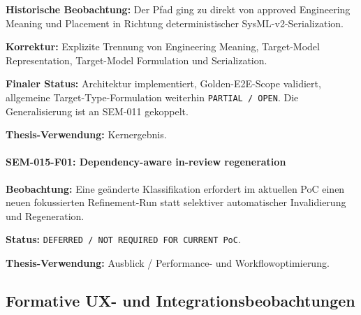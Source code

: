 \textbf{Historische Beobachtung:}
Der Pfad ging zu direkt von approved Engineering Meaning und Placement in Richtung
deterministischer SysML-v2-Serialization.

\textbf{Korrektur:}
Explizite Trennung von Engineering Meaning, Target-Model Representation,
Target-Model Formulation und Serialization.

\textbf{Finaler Status:}
Architektur implementiert, Golden-E2E-Scope validiert, allgemeine
Target-Type-Formulation weiterhin \texttt{PARTIAL / OPEN}. Die Generalisierung ist
an SEM-011 gekoppelt.

\textbf{Thesis-Verwendung:}
Kernergebnis.


\paragraph{SEM-015-F01: Dependency-aware in-review regeneration}

\textbf{Beobachtung:}
Eine geänderte Klassifikation erfordert im aktuellen PoC einen neuen fokussierten
Refinement-Run statt selektiver automatischer Invalidierung und Regeneration.

\textbf{Status:}
\texttt{DEFERRED / NOT REQUIRED FOR CURRENT PoC}.

\textbf{Thesis-Verwendung:}
Ausblick / Performance- und Workflowoptimierung.


\subsection{Formative UX- und Integrationsbeobachtungen}


